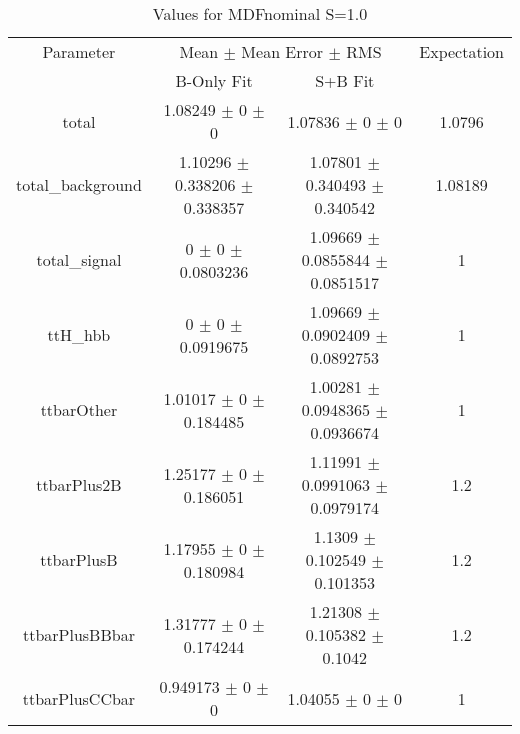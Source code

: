 \begin{table}
\centering
\caption{Values for MDFnominal S=1.0}
\begin{tabular}{cccc}
\toprule
Parameter & \multicolumn{2}{c}{Mean $\pm$ Mean Error $\pm$ RMS} & Expectation\\
 & B-Only Fit & S+B Fit & \\
\midrule
total & \num{1.08249} $\pm$ \num{0} $\pm$ \num{0} & \num{1.07836} $\pm$ \num{0} $\pm$ \num{0} & \num{1.0796}\\
total\_background & \num{1.10296} $\pm$ \num{0.338206} $\pm$ \num{0.338357} & \num{1.07801} $\pm$ \num{0.340493} $\pm$ \num{0.340542} & \num{1.08189}\\
total\_signal & \num{0} $\pm$ \num{0} $\pm$ \num{0.0803236} & \num{1.09669} $\pm$ \num{0.0855844} $\pm$ \num{0.0851517} & \num{1}\\
ttH\_hbb & \num{0} $\pm$ \num{0} $\pm$ \num{0.0919675} & \num{1.09669} $\pm$ \num{0.0902409} $\pm$ \num{0.0892753} & \num{1}\\
ttbarOther & \num{1.01017} $\pm$ \num{0} $\pm$ \num{0.184485} & \num{1.00281} $\pm$ \num{0.0948365} $\pm$ \num{0.0936674} & \num{1}\\
ttbarPlus2B & \num{1.25177} $\pm$ \num{0} $\pm$ \num{0.186051} & \num{1.11991} $\pm$ \num{0.0991063} $\pm$ \num{0.0979174} & \num{1.2}\\
ttbarPlusB & \num{1.17955} $\pm$ \num{0} $\pm$ \num{0.180984} & \num{1.1309} $\pm$ \num{0.102549} $\pm$ \num{0.101353} & \num{1.2}\\
ttbarPlusBBbar & \num{1.31777} $\pm$ \num{0} $\pm$ \num{0.174244} & \num{1.21308} $\pm$ \num{0.105382} $\pm$ \num{0.1042} & \num{1.2}\\
ttbarPlusCCbar & \num{0.949173} $\pm$ \num{0} $\pm$ \num{0} & \num{1.04055} $\pm$ \num{0} $\pm$ \num{0} & \num{1}\\
\bottomrule
\end{tabular}
\end{table}